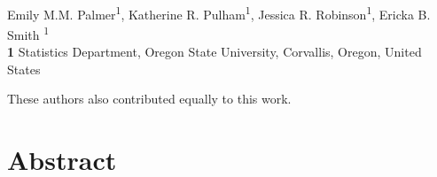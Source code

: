 \documentclass[10pt,letterpaper]{article}
\begin{document}
\vspace*{0.2in}

\begin{flushleft}
{\Large
\textbf{} %
}
\newline
\\
Emily M.M. Palmer\textsuperscript{1\ddag},
Katherine R. Pulham\textsuperscript{1\ddag},
Jessica R. Robinson\textsuperscript{1\ddag},
Ericka B. Smith \textsuperscript{1\ddag}
\\
\bigskip
\textbf{1} Statistics Department, Oregon State University, Corvallis, Oregon, United States
\\
\bigskip

%
%

\ddag These authors also contributed equally to this work.





\end{flushleft}
\section*{Abstract}
\end{document}
